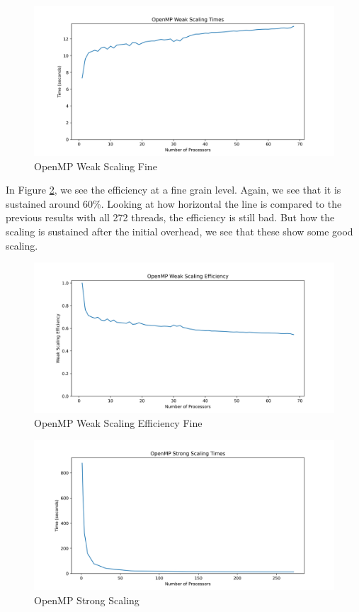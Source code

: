 \documentclass{article}
\begin{document}
\begin{figure}[H]
\centering
\includegraphics[width=6in]{figures/openmp_weak_scaling_times_fine.png}
\caption{OpenMP Weak Scaling Fine}
\label{fig:openmp-weak-scaling-fine}
\end{figure}

In Figure \ref{fig:openmp-weak-scaling-efficiency-fine}, we see the efficiency at a fine grain level. Again, we see that it is sustained around 60\%. Looking at how horizontal the line is compared to the previous results with all 272 threads, the efficiency is still bad. But how the scaling is sustained after the initial overhead, we see that these show some good scaling.

\begin{figure}[H]
\centering
\includegraphics[width=6in]{figures/openmp_weak_scaling_efficiency_fine.png}
\caption{OpenMP Weak Scaling Efficiency Fine}
\label{fig:openmp-weak-scaling-efficiency-fine}
\end{figure}

\begin{figure}[H]
\centering
\includegraphics[width=6in]{figures/openmp_strong_scaling_times.png}
\caption{OpenMP Strong Scaling}
\label{fig:openmp-strong-scaling}
\end{figure}
\end{document}
